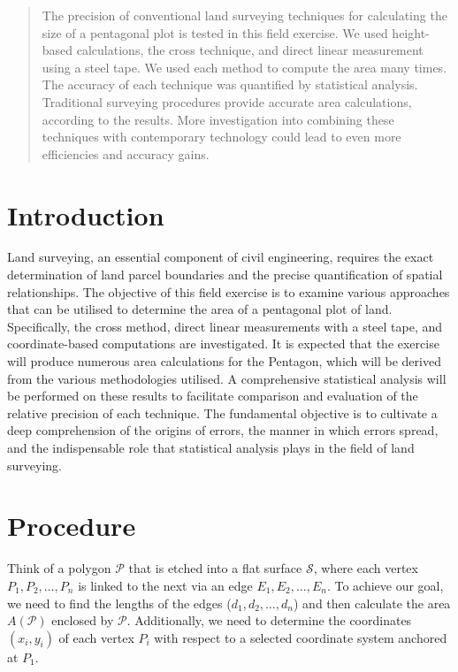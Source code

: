 \documentclass[12pt]{report}
\begin{document}
\newpage
\begin{abstract}
The precision of conventional land surveying techniques for calculating the size of a pentagonal plot is tested in this field exercise.  We used height-based calculations, the cross technique, and direct linear measurement using a steel tape.  We used each method to compute the area many times. The accuracy of each technique was quantified by statistical analysis. Traditional surveying procedures provide accurate area calculations, according to the results. More investigation into combining these techniques with contemporary technology could lead to even more efficiencies and accuracy gains.
\end{abstract}
\tableofcontents
\newpage
\section*{Introduction}

    Land surveying, an essential component of civil engineering, requires the exact determination of land parcel boundaries and the precise quantification of spatial relationships. The objective of this field exercise is to examine various approaches that can be utilised to determine the area of a pentagonal plot of land. Specifically, the cross method, direct linear measurements with a steel tape, and coordinate-based computations are investigated. It is expected that the exercise will produce numerous area calculations for the Pentagon, which will be derived from the various methodologies utilised.  A comprehensive statistical analysis will be performed on these results to facilitate comparison and evaluation of the relative precision of each technique. The fundamental objective is to cultivate a deep comprehension of the origins of errors, the manner in which errors spread, and the indispensable role that statistical analysis plays in the field of land surveying.

\section*{Procedure}

Think of a polygon \(\mathcal{P}\) that is etched into a flat surface \(\mathcal{S}\), where each vertex \(P_1, P_2, \ldots, P_n\) is linked to the next via an edge \(E_1, E_2, \ldots, E_n\). To achieve our goal, we need to find the lengths of the edges (\(d_1, d_2, \ldots, d_n\)) and then calculate the area \(A(\mathcal{P})\) enclosed by \(\mathcal{P}\). Additionally, we need to determine the coordinates \((x_i, y_i)\) of each vertex \(P_i\) with respect to a selected coordinate system anchored at \(P_1\).
\end{document}
